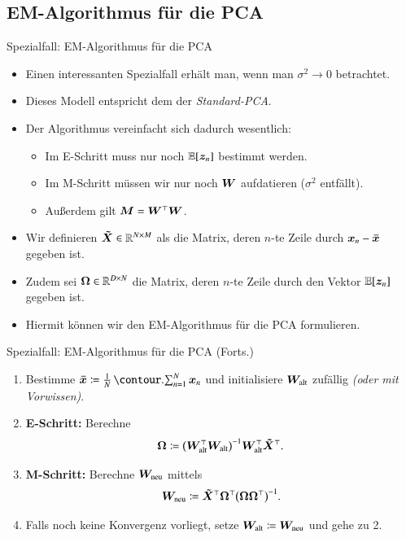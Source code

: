 \subsection{EM-Algorithmus für die PCA}

\begin{frame}{Spezialfall: EM-Algorithmus für die PCA}{}
	\begin{itemize}
		\item Einen interessanten Spezialfall erhält man, wenn man $\sigma^2 \rightarrow 0$ betrachtet.
		\item Dieses Modell entspricht dem der \textit{Standard-PCA}.
		\item Der Algorithmus vereinfacht sich dadurch wesentlich:
		\begin{itemize}
			\item Im E-Schritt muss nur noch $\mathbb{E}[\bm{z}_n]$ bestimmt werden.
			\item Im M-Schritt müssen wir nur noch $\bm{W}$ aufdatieren ($\sigma^2$ entfällt).
			\item Außerdem gilt $\bm{M} = \bm{W}^\top \bm{W}$.
		\end{itemize}
		\item Wir definieren $\bm{\tilde{X}} \in \mathbb{R}^{N \times M}$ als die Matrix, deren $n$-te Zeile durch $\bm{x}_n - \bm{\bar{x}}$ gegeben ist.
		\item Zudem sei $\bm{\Omega} \in \mathbb{R}^{D \times N}$ die Matrix, deren $n$-te Zeile durch den Vektor $\mathbb{E}[\bm{z}_n]$ gegeben ist.
		\item Hiermit können wir den EM-Algorithmus für die PCA formulieren.
	\end{itemize}
\end{frame}


\begin{frame}{Spezialfall: EM-Algorithmus für die PCA (Forts.)}{}
	\begin{myalg}
		\begin{enumerate}
			\item Bestimme $\bxmean \coloneqq \frac{1}{N} \sum_{n=1}^N \bx_n$ und initialisiere $\bm{W}_{\text{alt}}$ zufällig
				\textit{(oder mit Vorwissen)}.
			\item \textbf{E-Schritt:} Berechne
			\begin{equation}
				\bm{\Omega} \coloneqq \bigl( \bm{W}_{\text{alt}}^\top \bm{W}_{\text{alt}} \bigr)^{-1} \bm{W}_{\text{alt}}^\top \bm{\tilde{X}}^\top.
			\end{equation}
			\item \textbf{M-Schritt:} Berechne $\bm{W}_{\text{neu}}$ mittels
			\begin{equation}
				\bm{W}_{\text{neu}} \coloneqq \bm{\tilde{X}}^\top \bm{\Omega}^\top \bigl( \bm{\Omega} \bm{\Omega}^\top \bigr)^{-1}.
			\end{equation}
			\item Falls noch keine Konvergenz vorliegt, setze $\bm{W}_{\text{alt}} \coloneqq \bm{W}_{\text{neu}}$ und gehe zu 2.
		\end{enumerate}
	\end{myalg}
\end{frame}


